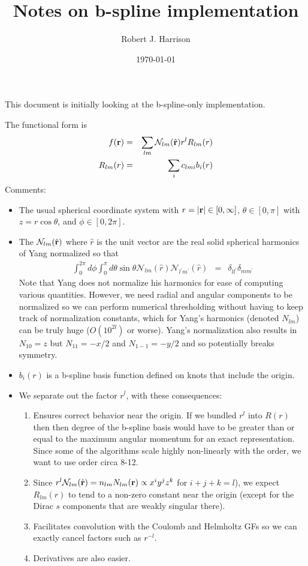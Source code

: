 \documentclass[12pt]{article}
\title{Notes on b-spline implementation}
\date{\today}
\author{Robert J. Harrison}
\newcommand{\N}{\mathcal{N}}
\newcommand{\rv}{\vb{r}}
\newcommand{\rhat}{\hat{\rv}}
\begin{document}
\maketitle

This document is initially looking at the b-spline-only implementation. 

The functional form is
\begin{eqnarray}
  f(\vb{r}) & = & \sum_{l m} \N_{lm}(\rhat) r^l R_{lm}(r) \\
  R_{lm}(r) & = & \sum_i c_{lmi} b_i(r)
\end{eqnarray}
Comments:
\begin{itemize}
\item The usual spherical coordinate system with $r = |\rv| \in [0,\infty]$, $\theta \in [0,\pi]$ with $z=r \cos \theta$, and $\phi \in [0,2 \pi]$.
\item The $\N_{lm}(\rhat)$ where $\hat{r}$ is the unit vector are the real solid spherical harmonics of Yang normalized so that
\begin{eqnarray}
  \int_0^{2 \pi} d\phi \int_0^\pi d\theta \sin \theta  \N_{lm} (\hat{r}) \N_{l^\prime m^\prime}(\hat{r})  & = & \delta_{l l^\prime} \delta_{m m^\prime}
\end{eqnarray}
Note that Yang does not normalize his harmonics for ease of computing various quantities.  However, we need radial and angular components to be normalized so we can perform numerical thresholding without having to keep track of normalization constants, which for Yang's harmonics (denoted $N_{lm}$)  can be truly huge ($O(10^{2l})$ or worse).  Yang's normalization also results in $N_{10}=z$ but $N_{11}=-x/2$ and $N_{1-1}=-y/2$ and so potentially breaks symmetry.  
\item $b_i(r)$ is a b-spline basis function defined on knots that include the origin. 
\item We separate out the factor $r^l$, with these consequences:
  \begin{enumerate}
  \item Ensures correct behavior near the origin.  If we bundled $r^l$ into $R(r)$ then then degree of the b-spline basis would have to be greater than or equal to the maximum angular momentum for an exact representation.  Since some of the algorithms scale highly non-linearly with the order, we want to use order circa 8-12.
  \item Since $r^l \N_{lm}(\rhat) = n_{lm} N_{lm}(\rv) \propto  x^i y^j z^k$ for $i+j+k=l$), we expect $R_{lm}(r)$ to tend to a non-zero constant near the origin (except for the Dirac $s$ components that are weakly singular there).  
  \item Facilitates convolution with the Coulomb and Helmholtz GFs so we can exactly cancel factors such as $r^{-l}$.
  \item Derivatives are also easier.
  \end{enumerate}
\end{itemize}
\end{document}
